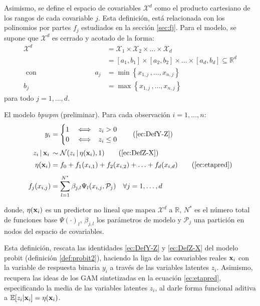 \documentclass[../Main/Main.tex]{subfiles}
\begin{document}
Asimismo, se define el espacio de covariables $\mathcal{X}^d$ como el producto cartesiano de los rangos de cada covariable $j$. Esta definición, está relacionada con los polinomios por partes $f_j$ estudiados en la sección \ref{sec:fj}. Para el modelo, se supone que $\mathcal{X}^d$ es cerrado y acotado de la forma:
\begin{align*}
	\mathcal{X}^d &= \mathcal{X}_1\times\mathcal{X}_2\times\ldots\times\mathcal{X}_d\\
	&= [a_1,b_1]\times[a_2,b_2]\times\ldots\times[a_d,b_d] \subseteq \mathbb{R}^d \\ 
\text{ con }\qquad\qquad\qquad\qquad a_j &= \min\left\{x_{1,j}\, ,\ldots,x_{n,j}\right\} \\
	b_j &= \max\left\{x_{1,j}\, ,\ldots,x_{n,j}\right\}
\end{align*}
para todo $j = 1,\ldots,d$.\\

\begin{definition} \label{def:BPWPMPrelim}
El modelo \textit{bpwpm} (preliminar). Para cada observación $i = 1,\ldots,n$:
\begin{align}
y_i &= 
	\begin{cases}
		1 & \iff \enspace z_i > 0 \\									0 & \iff \enspace z_i \leq 0
	\end{cases} \tag{\ref{ec:DefY-Z}} \\[2pt]
z_i\,|\,\xni\, &\sim \mathcal{N}(z_i\,|\,\eta(\xni),1) \tag{\ref{ec:DefZ-X}} \\[2pt]
\eta(\xni) &= f_0 + f_1(x_{i,1}) + f_2(x_{i,2}) + \ldots + f_d(x_{i,d}) \tag{\ref{ec:etapred}} \\[4pt]
f_j(x_{i,j}) &= \sum_{l = 1}^{\N} \beta_{j,l} \Psi_l(x_{i,j}, \mathcal{P}_j) \quad \forall j = 1,\ldots,d \label{ec:fj}
\end{align}	
\end{definition}
donde, $\eta(\mathbf{x}_i)$ es un predictor no lineal que mapea $\mathcal{X}^d$ a $\mathbb{R}$, $N^*$ es el número total de funciones base $\Psi(\cdot)_l$, $\beta_{j,l}$ los parámetros de modelo y $\mathcal{P}_j$ una partición en nodos del espacio de covariables.

Esta definición, rescata las identidades \eqref{ec:DefY-Z} y \eqref{ec:DefZ-X} del modelo probit (definición \ref{def:probit2}), haciendo la liga de las covariables reales $\mathbf{x}_i$ con la variable de respuesta binaria $y_i$ a través de las variables latentes $z_i$. Asimismo, recupera las ideas de los GAM sintetizadas en la ecuación \eqref{ec:etapred}, especificando la media de las variables latentes $z_i$, al darle forma funcional aditiva a $\mathbb{E}[z_i|\mathbf{x}_i] = \eta(\mathbf{x}_i)$. 
\end{document}
